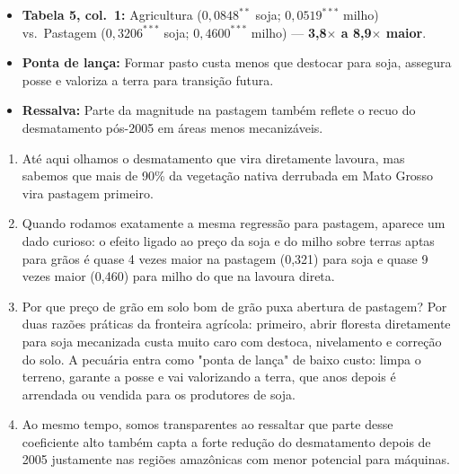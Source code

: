 \documentclass[11pt,a4paper]{article}
\begin{document}
\begin{tcolorbox}[title={\bfseries\small ÂNCORAS DO SLIDE}]
\begin{itemize}[leftmargin=*,itemsep=1mm,topsep=0.5mm]
    \item \textbf{Tabela 5, col.\ 1:} Agricultura ($0{,}0848^{**}$ soja; $0{,}0519^{***}$ milho) vs.\ Pastagem ($0{,}3206^{***}$ soja; $0{,}4600^{***}$ milho) --- \textbf{3,8$\times$ a 8,9$\times$ maior}.
    \item \textbf{Ponta de lança:} Formar pasto custa menos que destocar para soja, assegura posse e valoriza a terra para transição futura.
    \item \textbf{Ressalva:} Parte da magnitude na pastagem também reflete o recuo do desmatamento pós-2005 em áreas menos mecanizáveis.
\end{itemize}
\end{tcolorbox}
\vspace{2mm}

\vspace{1mm}
\begin{enumerate}[leftmargin=*,label=\textbf{(\arabic*)},itemsep=2.6mm,topsep=1mm]
    \item Até aqui olhamos o desmatamento que vira diretamente lavoura, mas sabemos que mais de 90\% da vegetação nativa derrubada em Mato Grosso vira pastagem primeiro.
    \item Quando rodamos exatamente a mesma regressão para pastagem, aparece um dado curioso: o efeito ligado ao preço da soja e do milho sobre terras aptas para grãos é quase 4 vezes maior na pastagem (0,321) para soja e quase 9 vezes maior (0,460) para milho do que na lavoura direta.
    \item Por que preço de grão em solo bom de grão puxa abertura de pastagem? Por duas razões práticas da fronteira agrícola: primeiro, abrir floresta diretamente para soja mecanizada custa muito caro com destoca, nivelamento e correção do solo. A pecuária entra como "ponta de lança" de baixo custo: limpa o terreno, garante a posse e vai valorizando a terra, que anos depois é arrendada ou vendida para os produtores de soja.
    \item Ao mesmo tempo, somos transparentes ao ressaltar que parte desse coeficiente alto também capta a forte redução do desmatamento depois de 2005 justamente nas regiões amazônicas com menor potencial para máquinas.
\end{enumerate}
\end{document}
